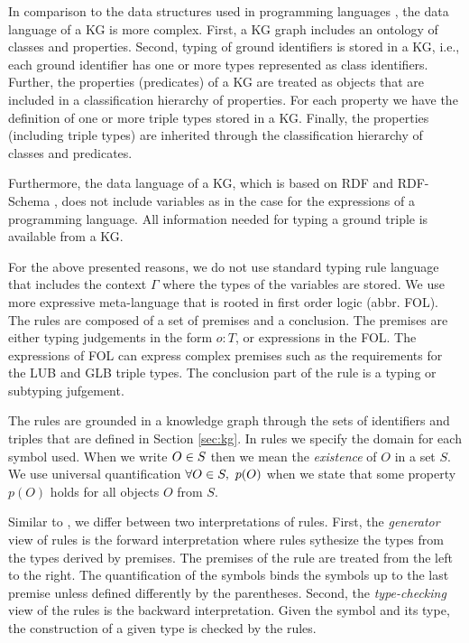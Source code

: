 \documentclass[runningheads]{llncs}
\begin{document}
In comparison to the data structures used in programming languages
\cite{Pierce2002,Hindley1997}, the data language of a KG is more
complex. First, a KG graph includes an ontology of classes and
properties. Second, typing of ground identifiers is stored in a KG,
i.e., each ground identifier has one or more types represented as
class identifiers. Further, the properties (predicates) of a KG are
treated as objects that are included in a classification hierarchy of
properties. For each property we have the definition of one or more
triple types stored in a KG. Finally, the properties (including triple
types) are inherited through the classification hierarchy of classes
and predicates.

Furthermore, the data language of a KG, which is based on RDF and
RDF-Schema \cite{rdf,rdfschema}, does not include variables as in
the case for the expressions of a programming language. All
information needed for typing a ground triple is available from a KG.

For the above presented reasons, we do not use standard typing rule
language \cite{Pierce2002,Hindley1997} that includes the context
$\Gamma$ where the types of the variables are stored. We use more
expressive meta-language that is rooted in first order logic
(abbr. FOL). The rules are composed of a set of premises and a
conclusion. The premises are either typing judgements in the form
$o:T$, or expressions in the FOL. The expressions of FOL can express
complex premises such as the requirements for the LUB and GLB triple
types. The conclusion part of the rule is a typing or subtyping
jufgement.

The rules are grounded in a knowledge graph through the sets of
identifiers and triples that are defined in Section
\ref{sec:kg}. In rules we specify the domain for each symbol used.
When we write $O\in\/S$ then we mean the \emph{existence} of $O$ in a
set $S$. We use universal quantification $\forall\/O\in\/S,\ p(O)$
when we state that some property $p(O)$ holds for all objects $O$ from
$S$.

Similar to \cite{Dunfield2021}, we differ between two interpretations
of rules. First, the \emph{generator} view of rules is the forward
interpretation where rules sythesize the types from the types derived
by premises. The premises of the rule are treated from the left to the
right. The quantification of the symbols binds the symbols up to the
last premise unless defined differently by the parentheses. Second,
the \emph{type-checking} view of the rules is the backward
interpretation. Given the symbol and its type, the construction of a
given type is checked by the rules.
\end{document}
